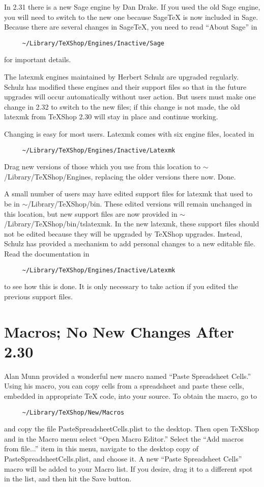 \documentclass[11pt, oneside]{amsart}
\begin{document}
In 2.31 there is a new Sage engine by Dan Drake. If you used the old Sage engine, you will need to switch to the new one because SageTeX is now included in Sage. Because there are several changes in SageTeX, you need to read ``About Sage'' in 
\begin{verbatim}
     ~/Library/TeXShop/Engines/Inactive/Sage
\end{verbatim}
for important details.

The latexmk engines maintained by Herbert Schulz are upgraded regularly. Schulz has modified these engines and their support files so that in the future upgrades will occur automatically without user action. But users must make one change in 2.32 to switch to the new files; if this change is not made, the old latexmk from TeXShop 2.30 will stay in place and continue working. 

Changing is easy for most users. Latexmk comes with six engine files, located in 
\begin{verbatim}
     ~/Library/TeXShop/Engines/Inactive/Latexmk
\end{verbatim}
Drag new versions of those which you use from this location to $\sim$/Library/TeXShop/Engines, replacing the older versions there now. Done.

A small number of users may have edited support files  for latexmk that used to be in $\sim$/Library/TeXShop/bin. These edited versions will remain unchanged in this location, but new support files are now provided in $\sim$/Library/TeXShop/bin/tslatexmk. In the new latexmk, these support files should not be edited because they will be upgraded by TeXShop upgrades. Instead, Schulz has provided a mechanism to add personal changes to a new editable file. Read the documentation in 
\begin{verbatim}
     ~/Library/TeXShop/Engines/Inactive/Latexmk
\end{verbatim}
to see how this is done. It is only necessary to take action if you edited the previous support files.

\section{Macros; No New Changes After 2.30}

Alan Munn provided a wonderful new macro named ``Paste Spreadsheet Cells.'' Using his macro, you can copy cells from a spreadsheet and paste these cells, embedded in appropriate TeX code, into your source. To obtain the macro, go to
\begin{verbatim}
     ~/Library/TeXShop/New/Macros
\end{verbatim}
and copy the file PasteSpreadsheetCells.plist to the desktop. Then open TeXShop and in the Macro menu select ``Open Macro Editor.'' Select the ``Add macros from file...'' item in this menu, navigate to the desktop copy of PasteSpreadsheetCells.plist, and choose it. A new ``Paste Spreadsheet Cells'' macro will be added to your Macro list. If you desire, drag it to a different spot in the list, and then hit the Save button.
\end{document}
